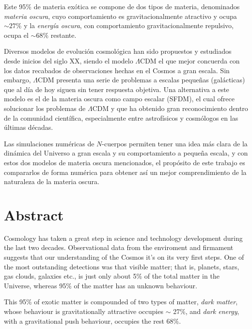 \documentclass[a4paper,openright,12pt]{book}
\begin{document}
Este 95\% de materia exótica se compone de dos tipos de materia, denominados \textit{materia oscura}, cuyo comportamiento es gravitacionalmente atractivo y ocupa $\sim 27\% $ y  la \textit{energía oscura}, con comportamiento gravitacionalmente repulsivo, ocupa el $\sim 68\%$ restante. 

Diversos modelos de evolución cosmológica han sido propuestos y estudiados desde inicios del siglo XX, siendo el modelo $\Lambda$CDM el que mejor concuerda con los datos recabados de observaciones hechas en el Cosmos a gran escala. Sin embargo, $\Lambda$CDM presenta una serie de problemas a escalas pequeñas (galácticas) que al día de hoy siguen sin tener respuesta objetiva. Una alternativa a este modelo es el de la materia oscura como campo escalar (SFDM), el cual ofrece solucionar los problemas de $\Lambda$CDM y que ha obtenido gran reconocimiento dentro de la comunidad científica, especialmente entre astrofísicos y cosmólogos en las últimas décadas.

Las simulaciones numéricas de $N$-cuerpos permiten tener una idea más clara de la dinámica del Universo a gran escala y su comportamiento a pequeña escala, y con estos dos modelos de materia oscura mencionados, el propósito de este trabajo es compararlos de forma numérica para obtener así un mejor comprendimiento de la naturaleza de la materia oscura.
\thispagestyle{empty}

\chapter*{Abstract} %

Cosmology has taken a great step in science and technology development during the last two decades. Observational data from the enviroment and firmament suggests that our understanding of the Cosmos it's on its very first steps. One of the most outstanding detections was that visible matter; that is, planets, stars, gas clouds, galaxies etc., is just only about 5\% of the total matter in the Universe, whereas 95\% of the matter has an unknown behaviour.

This 95\% of exotic matter is compounded of two types of matter, \textit{dark matter}, whose behaviour is gravitationally attractive occupies $\sim$ 27\%, and \textit{dark energy}, with a gravitational push behaviour, occupies the rest 68\%.
\end{document}
